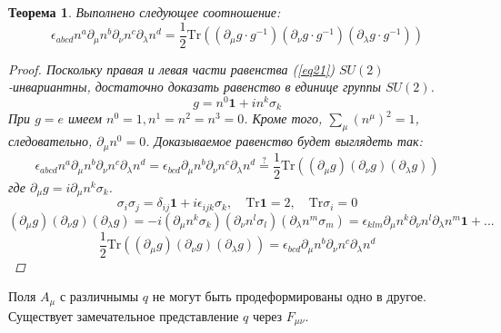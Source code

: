 \documentclass[12pt]{article}
\newtheorem{theorem}{Теорема}[section]
\theoremstyle{definition}
\begin{document}
\begin{theorem}
Выполнено следующее соотношение:
\begin{equation}\label{eq21}
    \epsilon_{abcd}n^a\partial_\mu n^b\partial_\nu n^c\partial_\lambda n^d=\frac{1}{2}\text{Tr}((\partial_\mu g\cdot g^{-1})(\partial_\nu g\cdot g^{-1})(\partial_\lambda g\cdot g^{-1}))
\end{equation}
\begin{proof}
    Поскольку правая и левая части равенства (\ref{eq21}) $SU(2)$-инвариантны, достаточно доказать равенство в единице группы $SU(2)$.\\
    \begin{equation}
        g=n^0\bm{1}+in^k\sigma_k
    \end{equation}
    При $g = e$ имеем $n^0 = 1, n^1 = n^2 = n^3 = 0$. Кроме того, $\sum\limits_\mu(n^\mu)^2 = 1$, следовательно, $\partial_\mu n^0=0$. Доказываемое равенство будет выглядеть так:
    \begin{equation}
        \epsilon_{abcd}n^a\partial_\mu n^b\partial_\nu n^c\partial_\lambda n^d=\epsilon_{bcd}\partial_\mu n^b\partial_\nu n^c\partial_\lambda n^d\overset{?}{=}\frac{1}{2}\text{Tr}((\partial_\mu g)(\partial_\nu g)(\partial_\lambda g))
    \end{equation}
    где $\partial_\mu g = i\partial_\mu n^k\sigma_k$.
    \begin{equation}
        \sigma_i\sigma_j=\delta_{ij}\bm{1}+i\epsilon_{ijk}\sigma_k,\quad\text{Tr}\bm{1}=2,\quad\text{Tr}\sigma_i=0
    \end{equation}
    \begin{equation}
        (\partial_\mu g)(\partial_\nu g)(\partial_\lambda g)=-i(\partial_\mu n^k\sigma_k)(\partial_\nu n^l\sigma_l)(\partial_\lambda n^m\sigma_m)=\epsilon_{klm}\partial_\mu n^k\partial_\nu n^l\partial_\lambda n^m\bm{1}+...
    \end{equation}
    \begin{equation}
        \frac{1}{2}\text{Tr}((\partial_\mu g)(\partial_\nu g)(\partial_\lambda g))=\epsilon_{bcd}\partial_\mu n^b\partial_\nu n^c\partial_\lambda n^d
    \end{equation}
\end{proof}
\end{theorem}
Поля $A_\mu$ с различнымы $q$ не могут быть продеформированы одно в другое. Существует замечательное представление $q$ через $F_{\mu\nu}$.
\end{document}
